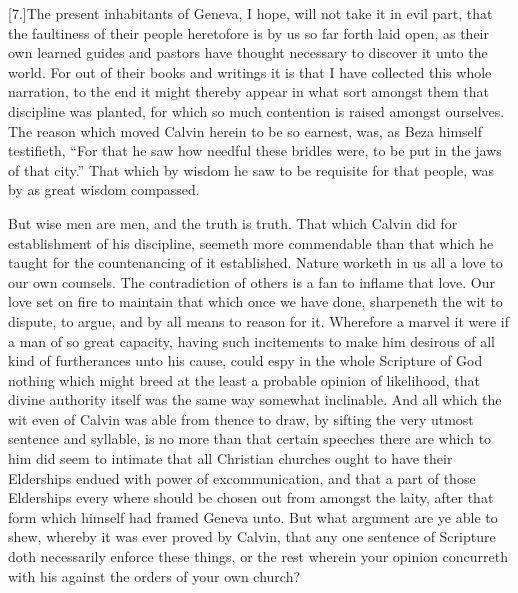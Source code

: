 [7.]The present inhabitants of Geneva, I hope, will not take it in evil part, that the faultiness of their people heretofore is by us so far forth laid open, as their own learned guides and pastors have thought necessary to discover it unto the world. For out of their books and writings it is that I have collected this whole narration, to the end it might thereby appear in what sort amongst them that discipline was planted, for which so much contention is raised amongst ourselves. The reason which moved Calvin herein to be so earnest, was, as Beza himself testifieth, “For that he saw how needful these bridles were, to be put in the jaws of that city.” That which by wisdom he saw to be requisite for that people, was by as great wisdom compassed.

But wise men are men, and the truth is truth. That which Calvin did for establishment of his discipline, seemeth more commendable than that which he taught for the countenancing of it established. Nature worketh in us all a love to our own counsels. The contradiction of others is a fan to inflame that love. Our love set on fire to maintain that which once we have done, sharpeneth the wit to dispute, to argue, and by all means to reason for it. Wherefore a marvel it were if a man of so great capacity, having such incitements to make him desirous of all kind of furtherances unto his cause, could espy in the whole Scripture of God nothing which might breed at the least a probable opinion of likelihood, that divine authority itself was the same way somewhat inclinable. And all which the wit even of Calvin was able from thence to draw, by sifting the very utmost sentence and syllable, is no more than that certain speeches there are which to him did seem to intimate that all Christian churches ought to have their Elderships endued with power of excommunication, and that a part of those Elderships every where should be chosen out from amongst the laity, after that form which himself had framed Geneva unto. But what argument are ye able to shew, whereby it was ever proved by Calvin, that any one sentence of Scripture doth necessarily enforce these things, or the rest wherein your opinion concurreth with his against the orders of your own church?

